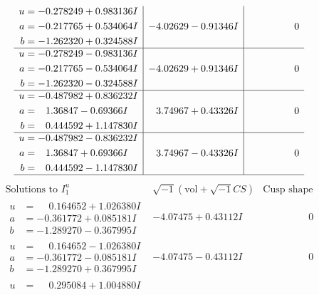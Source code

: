 \documentclass[1p]{elsarticle_modified}
\theoremstyle{definition}
\newcommand{\I}{\sqrt{-1}}
\begin{document}
$$\begin{array}{c|c|c}
\begin{aligned}
u &= -0.278249 + 0.983136 I \\
a &= -0.217765 + 0.534064 I \\
b &= -1.262320 + 0.324588 I\end{aligned}
 & -4.02629 - 0.91346 I & \phantom{-0.000000 } 0 \\ \hline\begin{aligned}
u &= -0.278249 - 0.983136 I \\
a &= -0.217765 - 0.534064 I \\
b &= -1.262320 - 0.324588 I\end{aligned}
 & -4.02629 + 0.91346 I & \phantom{-0.000000 } 0 \\ \hline\begin{aligned}
u &= -0.487982 + 0.836232 I \\
a &= \phantom{-}1.36847 - 0.69366 I \\
b &= \phantom{-}0.444592 + 1.147830 I\end{aligned}
 & \phantom{-}3.74967 + 0.43326 I & \phantom{-0.000000 } 0 \\ \hline\begin{aligned}
u &= -0.487982 - 0.836232 I \\
a &= \phantom{-}1.36847 + 0.69366 I \\
b &= \phantom{-}0.444592 - 1.147830 I\end{aligned}
 & \phantom{-}3.74967 - 0.43326 I & \phantom{-0.000000 } 0\\
 \hline 
 \end{array}$$\newpage$$\begin{array}{c|c|c}  
\text{Solutions to }I^u_{1}& \I (\text{vol} + \sqrt{-1}CS) & \text{Cusp shape}\\
 \hline 
\begin{aligned}
u &= \phantom{-}0.164652 + 1.026380 I \\
a &= -0.361772 + 0.085181 I \\
b &= -1.289270 - 0.367995 I\end{aligned}
 & -4.07475 + 0.43112 I & \phantom{-0.000000 } 0 \\ \hline\begin{aligned}
u &= \phantom{-}0.164652 - 1.026380 I \\
a &= -0.361772 - 0.085181 I \\
b &= -1.289270 + 0.367995 I\end{aligned}
 & -4.07475 - 0.43112 I & \phantom{-0.000000 } 0 \\ \hline\begin{aligned}
u &= \phantom{-}0.295084 + 1.004880 I \\

\end{aligned}
\end{array}$$
\end{document}
